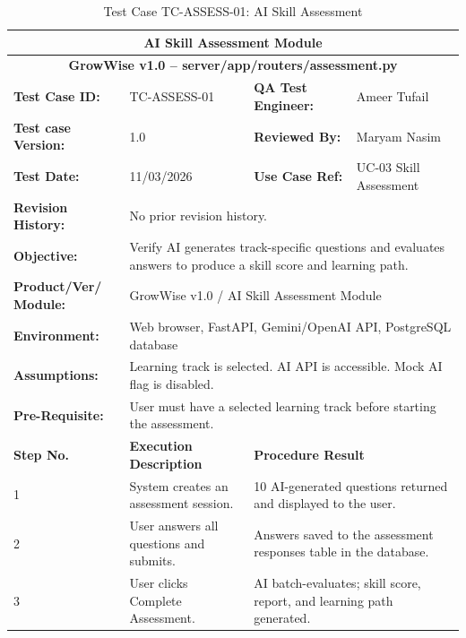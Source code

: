\documentclass{FastFyp}
\begin{document}
\begin{table}[H]
\footnotesize
\centering
\caption{Test Case TC-ASSESS-01: AI Skill Assessment}
\label{tab:tcassess}
\begin{tabular}{|p{2.5cm}|p{4cm}|p{2.5cm}|p{4.5cm}|}
\hline
\multicolumn{4}{|c|}{\textbf{AI Skill Assessment Module}} \\ \hline
\multicolumn{4}{|c|}{\textbf{GrowWise v1.0 -- server/app/routers/assessment.py}} \\ \hline
\textbf{Test Case ID:} & TC-ASSESS-01 & \textbf{QA Test Engineer:} & Ameer Tufail \\ \hline
\textbf{Test case Version:} & 1.0 & \textbf{Reviewed By:} & Maryam Nasim \\ \hline
\textbf{Test Date:} & 11/03/2026 & \textbf{Use Case Ref:} & UC-03 Skill Assessment \\ \hline
\textbf{Revision History:} & \multicolumn{3}{p{11cm}|}{No prior revision history.} \\ \hline
\textbf{Objective:} & \multicolumn{3}{p{11cm}|}{Verify AI generates track-specific questions and evaluates answers to produce a skill score and learning path.} \\ \hline
\textbf{Product/Ver/ Module:} & \multicolumn{3}{p{11cm}|}{GrowWise v1.0 / AI Skill Assessment Module} \\ \hline
\textbf{Environment:} & \multicolumn{3}{p{11cm}|}{Web browser, FastAPI, Gemini/OpenAI API, PostgreSQL database} \\ \hline
\textbf{Assumptions:} & \multicolumn{3}{p{11cm}|}{Learning track is selected. AI API is accessible. Mock AI flag is disabled.} \\ \hline
\textbf{Pre-Requisite:} & \multicolumn{3}{p{11cm}|}{User must have a selected learning track before starting the assessment.} \\ \hline
\textbf{Step No.} & \textbf{Execution Description} & \multicolumn{2}{p{7cm}|}{\textbf{Procedure Result}} \\ \hline
1 & System creates an assessment session. & \multicolumn{2}{p{7cm}|}{10 AI-generated questions returned and displayed to the user.} \\ \hline
2 & User answers all questions and submits. & \multicolumn{2}{p{7cm}|}{Answers saved to the assessment responses table in the database.} \\ \hline
3 & User clicks Complete Assessment. & \multicolumn{2}{p{7cm}|}{AI batch-evaluates; skill score, report, and learning path generated.} \\ \hline

\end{tabular}
\end{table}
\end{document}
